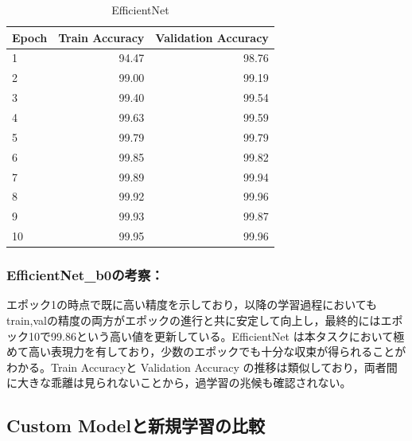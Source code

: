\documentclass[a4paper,11pt,titlepage]{jsarticle}
\begin{document}
\begin{table}[H]
\centering
\caption{EfficientNet}
\label{tab:efficientnet}
\begin{tabular}{lrr}
\hline
 Epoch &  Train Accuracy &  Validation Accuracy \\
\hline
     1 &           94.47 &                98.76 \\
     2 &           99.00 &                99.19 \\
     3 &           99.40 &                99.54 \\
     4 &           99.63 &                99.59 \\
     5 &           99.79 &                99.79 \\
     6 &           99.85 &                99.82 \\
     7 &           99.89 &                99.94 \\
     8 &           99.92 &                99.96 \\
     9 &           99.93 &                99.87 \\
    10 &           99.95 &                99.96 \\
\hline
\end{tabular}
\end{table}


\subsubsection*{EfficientNet\_b0の考察：}
エポック1の時点で既に高い精度を示しており，以降の学習過程においてもtrain,valの精度の両方がエポックの進行と共に安定して向上し，最終的にはエポック10で99.86という高い値を更新している。EfficientNet は本タスクにおいて極めて高い表現力を有しており，少数のエポックでも十分な収束が得られることがわかる。Train Accuracyと Validation Accuracy の推移は類似しており，両者間に大きな乖離は見られないことから，過学習の兆候も確認されない。


\subsection{Custom Modelと新規学習の比較}


  
\end{document}

